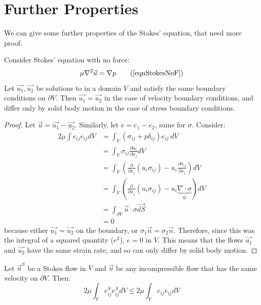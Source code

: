 \documentclass[../Main.tex]{subfiles}
\begin{document}
\section{Further Properties}
We can give some further properties of the Stokes' equation, that need more proof.
\begin{proposition}
    Consider Stokes' equation with no force:
    \begin{equation*}
        \mu \nabla^2 \vec{u} = \nabla p
        \tag{\ref{eqnStokesNoF}}
    \end{equation*}
    Let $\vec{u_1}, \vec{u_2}$ be solutions to  in a domain $V$ and satisfy the same boundary conditions on $\partial V$. Then $\vec{u_1} = \vec{u_2}$ in the case of velocity boundary conditions, and differ only by solid body motion in the case of stress boundary conditions.
    \label{propStokesUnique}
\end{proposition}
\begin{proof}
    Let $\vec{u} = \vec{u_1} - \vec{u_2}$. Similarly, let $e = e_1 - e_2$, same for $\sigma$. Consider:
    \begin{align*}
        2\mu \int e_{ij} e_{ij} dV &= \int_V \left(\sigma_{ij} + p \delta_{ij}\right)e_{ij}~dV \\
        &= \int_V \sigma_{ij} \frac{\partial u_i}{\partial x_j} dV \\
        &= \int_V \left(\frac{\partial}{\partial x_j} \left(u_i \sigma_{ij}\right) - u_i \frac{\partial \sigma_{ij}}{\partial x_j}\right) dV \\
        &= \int_V \left(\frac{\partial}{\partial x_j} \left(u_i \sigma_{ij}\right) - u_i \underbrace{\nabla \cdot \sigma}_{0}\right) dV \\
        &= \int_{\partial V} \vec{u} \cdot \sigma\vec{dS} \\
        &= 0
    \end{align*}
    because either $\vec{u_1} = \vec{u_2}$ on the boundary, or $\sigma_1 \vec{n} = \sigma_2\vec{n}$.
    Therefore, since this was the integral of a squared quantity ($e^2$), $e = 0$ in $V$. This means that the flows $\vec{u_1}$ and $\vec{u_2}$ have the same strain rate, and so can only differ by solid body motion.
\end{proof}
\begin{theorem}
    Let $\vec{u}^S$ be a Stokes flow in $V$ and $\vec{u}$ be any incompressible flow that has the same velocity on $\partial V$. Then:
    \begin{equation}
        2\mu \int_V e_{ij}^S e_{ij}^S dV \leq 2\mu \int_V e_{ij} e_{ij} dV
        \label{eqnMinimumDissp}
    \end{equation}
    \label{thmMinimumDissp}
\end{theorem}
\end{document}

